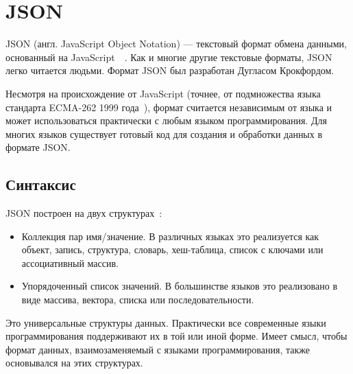 \documentclass[a4page]{article}
\begin{document}
\newpage
\section{JSON}
JSON (англ. JavaScript Object Notation) ---
текстовый формат обмена данными, основанный на JavaScript~\cite{rfc8259}~\cite{ISO21778}.
Как и многие другие текстовые форматы, JSON легко читается людьми.
Формат JSON был разработан Дугласом Крокфордом.

Несмотря на происхождение от JavaScript
(точнее, от подмножества языка стандарта ECMA-262 1999 года~\cite{ecma:262}),
формат считается независимым от языка и может использоваться практически с любым языком программирования.
Для многих языков существует готовый код для создания и обработки данных в формате JSON.

\subsection{Синтаксис}
JSON построен на двух структурах~\cite{json}:

\begin{itemize}
	\item Коллекция пар имя/значение.
	      В различных языках это реализуется как объект, запись, структура, словарь, хеш-таблица,
	      список с ключами или ассоциативный массив.
	\item Упорядоченный список значений.
	      В большинстве языков это реализовано в виде массива, вектора, списка или последовательности.
\end{itemize}

Это универсальные структуры данных. Практически все современные языки программирования поддерживают их
в той или иной форме. Имеет смысл, чтобы формат данных, взаимозаменяемый с языками программирования,
также основывался на этих структурах.
\end{document}
